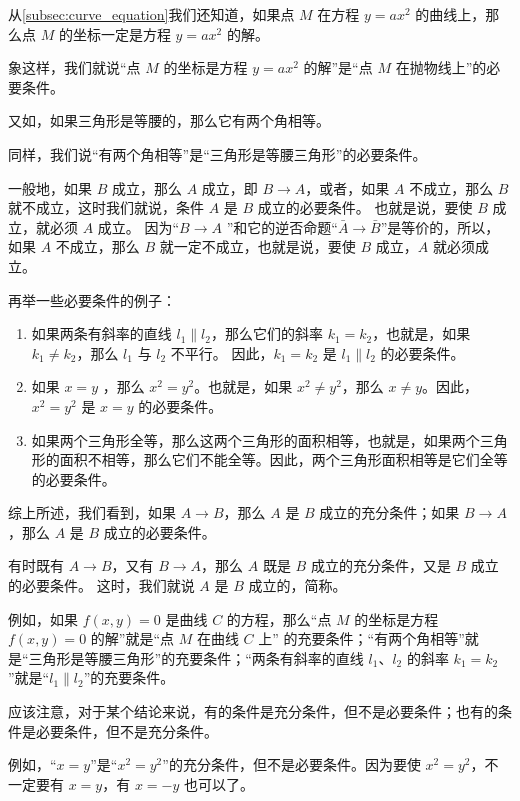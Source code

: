 从\cref{subsec:curve_equation}我们还知道，如果点 $M$ 在方程 $y=ax^2$ 的曲线上，那么点 $M$ 的坐标一定是方程 $y=ax^2$ 的解。

象这样，我们就说“点 $M$ 的坐标是方程 $y = a{x}^{2}$ 的解”是“点 $M$ 在抛物线上”的必要条件。

又如，如果三角形是等腰的，那么它有两个角相等。

同样，我们说“有两个角相等”是“三角形是等腰三角形”的必要条件。

一般地，如果 $B$ 成立，那么 $A$ 成立，即 $B \to A$，或者，如果 $A$ 不成立，那么 $B$ 就不成立，这时我们就说，条件 $A$ 是 $B$ 成立的必要条件。
也就是说，要使 $B$ 成立，就必须 $A$ 成立。
因为“$B \to A$ ”和它的逆否命题“$\bar{A} \to \bar{B}$”是等价的，所以，如果 $A$ 不成立，那么 $B$ 就一定不成立，也就是说，要使 $B$ 成立，$A$ 就必须成立。

再举一些必要条件的例子：
\begin{enumerate}
  \item 如果两条有斜率的直线 $l_1\parallel l_2$，那么它们的斜率 $k_1=k_2$，也就是，如果 $k_1\neq k_2$，那么 $l_1$ 与 $l_2$ 不平行。
  因此，$k_1=k_2$ 是 $l_1\parallel l_2$ 的必要条件。
  \item 如果 $x=y$ ，那么 $x^2=y^2$。也就是，如果 $x^2\neq y^2$，那么 $x\neq y$。因此，$x^2=y^2$ 是 $x=y$ 的必要条件。
  \item 如果两个三角形全等，那么这两个三角形的面积相等，也就是，如果两个三角形的面积不相等，那么它们不能全等。因此，两个三角形面积相等是它们全等的必要条件。
\end{enumerate}

综上所述，我们看到，如果 $A \to B$，那么 $A$ 是 $B$ 成立的充分条件；如果 $B \to A$，那么 $A$ 是 $B$ 成立的必要条件。

有时既有 $A \to B$，又有 $B \to A$，那么 $A$ 既是 $B$ 成立的充分条件，又是 $B$ 成立的必要条件。
这时，我们就说 $A$ 是 $B$ 成立的，简称。

例如，如果 $f(x,y)=0$ 是曲线 $C$ 的方程，那么“点 $M$ 的坐标是方程 $f(x,y)=0$ 的解”就是“点 $M$ 在曲线 $C$ 上” 的充要条件；“有两个角相等”就是“三角形是等腰三角形”的充要条件；“两条有斜率的直线 $l_1$、$l_2$ 的斜率 $k_1=k_2$”就是“$l_1\parallel l_2$”的充要条件。

应该注意，对于某个结论来说，有的条件是充分条件，但不是必要条件；也有的条件是必要条件，但不是充分条件。

例如，“$x=y$”是“$x^2=y^2$”的充分条件，但不是必要条件。因为要使 $x^2=y^2$，不一定要有 $x=y$，有 $x=-y$ 也可以了。

